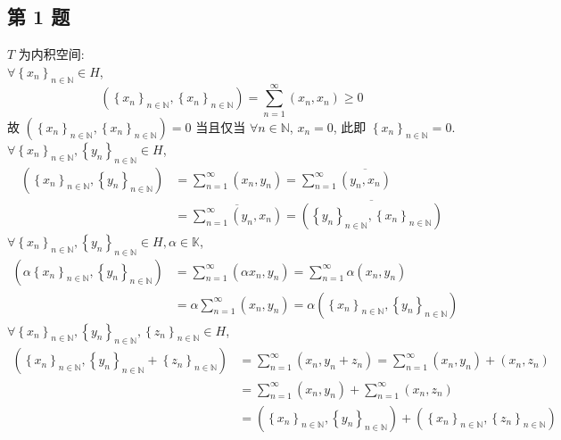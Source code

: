 \documentclass[../main.tex]{subfiles}
\begin{document}
\subsection{第 1 题}
$T$ 为内积空间: \\
$\forall \left\{ x_n \right\}_{n \in \mathbb{N}} \in H$,
\[
    \left( \left\{ x_n \right\}_{n \in \mathbb{N}}, \left\{ x_n \right\}_{n \in \mathbb{N}} \right)
    = \sum_{n = 1}^{\infty} \left( x_n , x_n \right)
    \geqslant 0
\]
故 $\left( \left\{ x_n \right\}_{n \in \mathbb{N}}, \left\{ x_n \right\}_{n \in \mathbb{N}} \right) = 0$
当且仅当 $\forall n \in \mathbb{N}$, $x_n = 0$, 此即 $\left\{ x_n \right\}_{n \in \mathbb{N}} = 0$. \\
$\forall \left\{ x_n \right\}_{n \in \mathbb{N}}, \left\{ y_n \right\}_{n \in \mathbb{N}} \in H$,
\begin{align*}
    \left( \left\{ x_n \right\}_{n \in \mathbb{N}}, \left\{ y_n \right\}_{n \in \mathbb{N}} \right)
    &= \sum_{n = 1}^{\infty} \left( x_n, y_n \right)
    = \sum_{n = 1}^{\infty} \overline{\left( y_n, x_n \right)} \\
    &= \overline{\sum_{n = 1}^{\infty} \left( y_n, x_n \right)}
    = \overline{\left( \left\{ y_n \right\}_{n \in \mathbb{N}}, \left\{ x_n \right\}_{n \in \mathbb{N}} \right)}
\end{align*}
$\forall \left\{ x_n \right\}_{n \in \mathbb{N}}, \left\{ y_n \right\}_{n \in \mathbb{N}}\in H, \alpha \in \mathbb{K}$,
\begin{align*}
    \left( \alpha \left\{ x_n \right\}_{n \in \mathbb{N}}, \left\{ y_n \right\}_{n \in \mathbb{N}}\right)
    &= \sum_{n = 1}^{\infty} \left( \alpha x_n, y_n \right)
    = \sum_{n = 1}^{\infty} \alpha \left( x_n, y_n \right) \\
    &= \alpha \sum_{n = 1}^{\infty} \left( x_n , y_n \right)
    = \alpha \left( \left\{ x_n \right\}_{n \in \mathbb{N}}, \left\{ y_n \right\}_{n \in \mathbb{N}} \right)
\end{align*}
$\forall \left\{ x_n \right\}_{n \in \mathbb{N}}, \left\{ y_n \right\}_{n \in \mathbb{N}}, \left\{ z_n \right\}_{n \in \mathbb{N}} \in H$,
\begin{align*}
    \left( \left\{ x_n \right\}_{n \in \mathbb{N}}, \left\{ y_n \right\}_{n \in \mathbb{N}} + \left\{ z_n \right\}_{n \in \mathbb{N}} \right)
    &= \sum_{n = 1}^{\infty} \left( x_n, y_n + z_n \right)
    = \sum_{n = 1}^{\infty} \left( x_n, y_n \right) + \left( x_n , z_n \right) \\
    &= \sum_{n = 1}^{\infty} \left( x_n, y_n \right) + \sum_{n = 1}^{\infty} \left( x_n, z_n \right) \\
    &= \left( \left\{ x_n \right\}_{n \in \mathbb{N}}, \left\{ y_n \right\}_{n \in \mathbb{N}} \right) + \left( \left\{ x_n \right\}_{n \in \mathbb{N}}, \left\{ z_n \right\}_{n \in \mathbb{N}} \right)
\end{align*}
\end{document}
